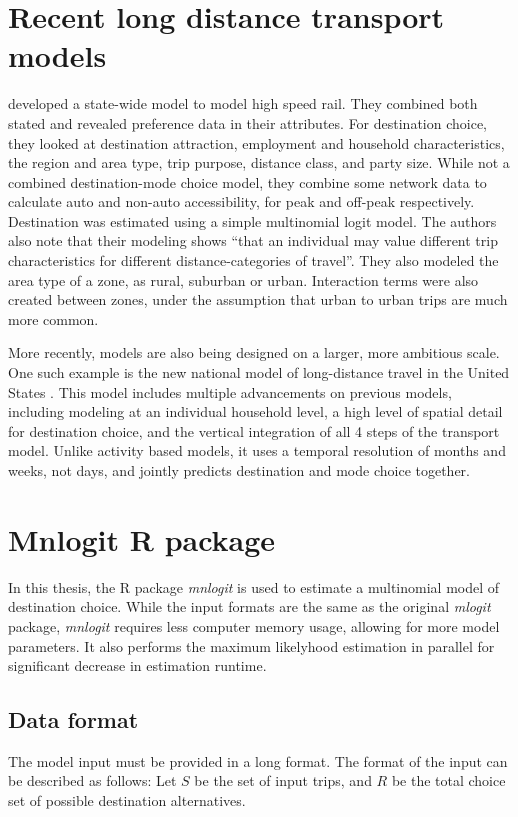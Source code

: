 \section{Recent long distance transport models}
\textcite{Outwater10} developed a state-wide model to model high speed rail. They combined both stated and revealed preference data in their attributes. For destination choice, they looked at destination attraction, employment and household characteristics, the region and area type, trip purpose, distance class, and party size. While not a combined destination-mode choice model, they combine some network data to calculate auto and non-auto accessibility, for peak and off-peak respectively. Destination was estimated using a simple multinomial logit model. The authors also note that their modeling shows \enquote{that an individual may value different trip characteristics for different distance-categories of travel}. They also modeled the area type of a zone, as rural, suburban or urban. Interaction terms were also created between zones, under the assumption that urban to urban trips are much more common.

More recently, models are also being designed on a larger, more ambitious scale. One such example is the new national model of long-distance travel in the United States \parencite{Outwater15}. This model includes multiple advancements on previous models, including modeling at an individual household level, a high level of spatial detail for destination choice, and the vertical integration of all 4 steps of the transport model. Unlike activity based models, it uses a temporal resolution of months and weeks, not days, and jointly predicts destination and mode choice together. 

\section{Mnlogit R package}
\label{section:mnlogit-structure}
\label{section:mnlogit}
In this thesis, the R package \textit{mnlogit} \parencite{hasan2014fast} is used to estimate a multinomial model of destination choice. While the input formats are the same as the original \textit{mlogit} package, \textit{mnlogit} requires less computer memory usage, allowing for more model parameters. It also performs the maximum likelyhood estimation in parallel for significant decrease in estimation runtime.
\subsection*{Data format}
The model input must be provided in a long format. The format of the input can be described as follows:
Let \(S\)  be the set of input trips, and \(R\)  be the total choice set of possible destination alternatives. 

